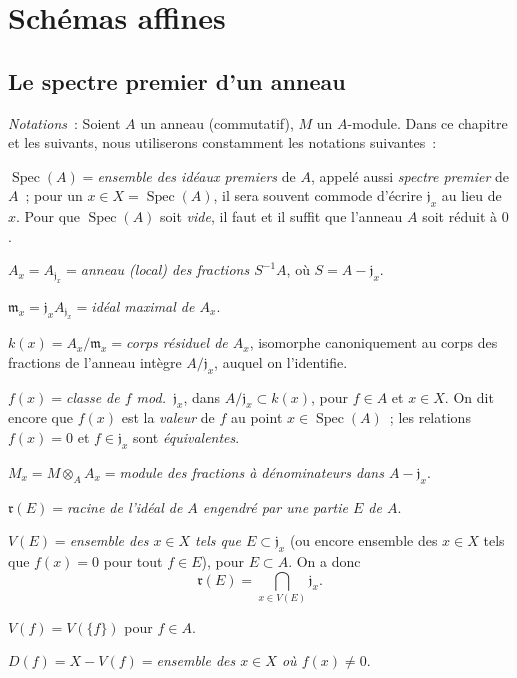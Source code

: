 \setcounter{section}{0}
\section{Schémas affines}
\label{section:I.1-fr}

\setcounter{subsection}{0}
\subsection{Le spectre premier d'un anneau}
\label{subsection:I.1.1-fr}

\begin{env}[1.1.1]
\label{I.1.1.1-fr}
\emph{Notations}~: Soient $A$ un anneau (commutatif), $M$ un $A$-module. Dans
ce chapitre et les suivants, nous utiliserons constamment les notations
suivantes~:

\smallskip
\noindent
$\operatorname{Spec}(A)={}$\emph{ensemble des idéaux premiers} de $A$, appelé
aussi \emph{spectre premier} de $A$~; pour un
$x\in X=\operatorname{Spec}(A)$, il sera souvent commode d'écrire
$\mathfrak{j}_x$ au lieu de $x$. Pour que $\operatorname{Spec}(A)$ soit
\emph{vide}, il faut et il suffit que l'anneau $A$ soit réduit à $0$.

\smallskip
\noindent
$A_x=A_{\mathfrak{j}_x}={}$\emph{anneau (local) des fractions $S^{-1}A$}, où
$S=A-\mathfrak{j}_x$.

\smallskip
\noindent
$\mathfrak{m}_x=\mathfrak{j}_xA_{\mathfrak{j}_x}={}$\emph{idéal maximal de
$A_x$}.

\smallskip
\noindent
$k(x)=A_x/\mathfrak{m}_x={}$\emph{corps résiduel de $A_x$}, isomorphe
canoniquement au corps des fractions de l'anneau intègre
$A/\mathfrak{j}_x$, auquel on l'identifie.

\smallskip
\noindent
$f(x)={}$\emph{classe de $f$ mod.~$\mathfrak{j}_x$}, dans
$A/\mathfrak{j}_x\subset k(x)$, pour $f\in A$ et $x\in X$. On dit encore que
$f(x)$ est la \emph{valeur} de $f$ au point $x\in\operatorname{Spec}(A)$~;
les relations $f(x)=0$ et $f\in\mathfrak{j}_x$ sont \emph{équivalentes}.

\smallskip
\noindent
$M_x=M\otimes_AA_x={}$\emph{module des fractions à dénominateurs dans
$A-\mathfrak{j}_x$}.

\smallskip
\noindent
$\mathfrak{r}(E)={}$\emph{racine de l'idéal de $A$ engendré par une partie
$E$ de $A$}.

\smallskip
\noindent
$V(E)={}$\emph{ensemble des $x\in X$ tels que $E\subset\mathfrak{j}_x$}
(ou encore ensemble des $x\in X$ tels que $f(x)=0$ pour tout $f\in E$), pour
$E\subset A$. On a donc
\begin{equation}
  \mathfrak{r}(E)=\bigcap_{x\in V(E)}\mathfrak{j}_x.
  \tag{1.1.1.1}\label{I.1.1.1.1-fr}
\end{equation}

\smallskip
\noindent
$V(f)=V(\{f\})$ pour $f\in A$.

\smallskip
\noindent
$D(f)=X-V(f)={}$\emph{ensemble des $x\in X$ où $f(x)\neq0$}.
\end{env}

